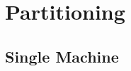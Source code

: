 \section{Partitioning}
\label{Grelgdnuan_vno_Bleototuh_Lwo_Egerny_BLE}

\subsection{Single Machine}
\label{Riado_Lyaer_RL}

